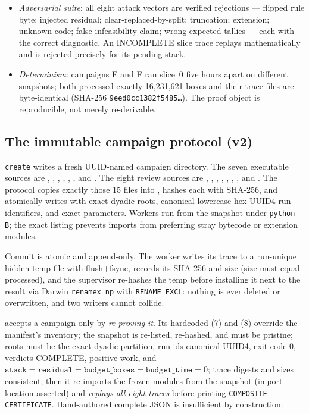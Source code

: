 \documentclass[11pt]{article}
\theoremstyle{plain}
\theoremstyle{definition}
\theoremstyle{remark}
\begin{document}
\begin{itemize}
\item \emph{Adversarial suite}: all eight attack vectors are verified rejections ---
flipped rule byte; injected residual; clear-replaced-by-split; truncation;
extension; unknown code; false infeasibility claim; wrong expected tallies --- each
with the correct diagnostic. An INCOMPLETE slice trace replays mathematically and is
rejected precisely for its pending stack.
\item \emph{Determinism}: campaigns E and F ran slice~0 five hours apart on
different snapshots; both processed exactly 16{,}231{,}621 boxes and their trace
files are byte-identical (SHA-256 \texttt{9eed0cc1382f5485\ldots}). The proof
object is reproducible, not merely re-derivable.
\end{itemize}

\subsection{The immutable campaign protocol (v2)}
\label{sec:protocol}
 \texttt{create} writes a fresh UUID-named campaign directory.
The seven executable sources are , ,
, , ,
, and .  The eight review sources are
, , ,
, ,
, , and .
The protocol copies exactly those 15 files into , hashes each
with SHA-256, and atomically writes  with exact dyadic roots,
canonical lowercase-hex UUID4 run identifiers, and exact parameters.  Workers
run from the snapshot under \texttt{python -B}; the exact listing prevents
imports from preferring stray bytecode or extension modules.

Commit is atomic and append-only. The worker writes its trace to a run-unique
hidden temp file with flush+fsync, records its SHA-256 and size (size must equal
processed), and the supervisor re-hashes the temp before installing it next to the
result via Darwin \texttt{renamex\_np} with \texttt{RENAME\_EXCL}: nothing is
ever deleted or overwritten, and two writers cannot collide.

 accepts a campaign only by \emph{re-proving it}.  Its
hardcoded  (7) and
 (8) override the manifest's inventory;
the snapshot is re-listed, re-hashed, and must be pristine; roots must be the
exact dyadic partition, run ids canonical UUID4, exit code 0, verdicts
COMPLETE, positive work, and
$\texttt{stack}=\texttt{residual}=\texttt{budget\_boxes}=\texttt{budget\_time}=0$;
trace digests and sizes consistent; then it re-imports the frozen modules from the
snapshot (import location asserted) and \emph{replays all eight traces} before
printing \texttt{COMPOSITE CERTIFICATE}. Hand-authored complete JSON is
insufficient by construction.
\end{document}
